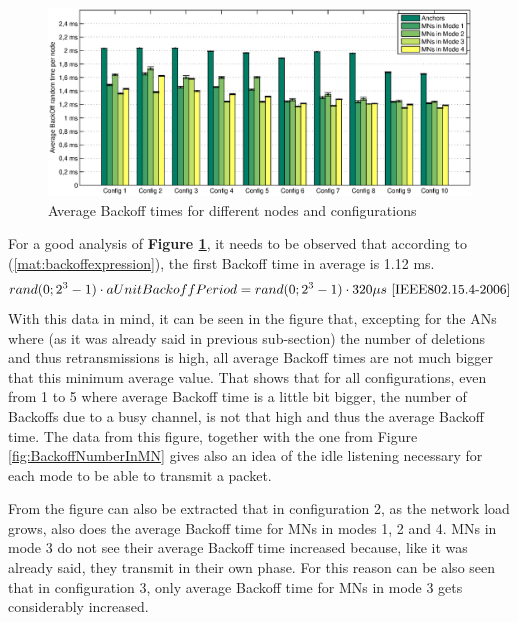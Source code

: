 \begin{figure}[ht]
 \begin{center}
  \includegraphics[width=1\textwidth]{averageBackoffTimeANandMN.eps}
 \end{center}
 \caption{Average Backoff times for different nodes and configurations}
 \label{fig:averageBackoffTimeANandMN}
\end{figure}

For a good analysis of \textbf{Figure \ref{fig:averageBackoffTimeANandMN}}, it needs to be observed that according to (\ref{mat:backoffexpression}),
the first Backoff time in average is 1.12 ms.
\begin{equation}
  rand(0;  2^3-1)\cdot aUnitBackoffPeriod = rand(0; 2^3-1)\cdot 320\mu s\ \cite{IEEE802.15.4-2006}
  \label{mat:backoffexpression}
\end{equation}
With this data in mind, it can be seen in the figure that, excepting for the \acp{AN} where (as it was already said in previous sub-section) the 
number of deletions and thus retransmissions is high, all average Backoff times are not much bigger that this minimum average value. That shows that for
all configurations, even from 1 to 5 where average Backoff time is a little bit bigger, the number of Backoffs due to a busy channel,
is not that high and thus the average Backoff time. The data from this figure, together with the one from Figure \ref{fig:BackoffNumberInMN} gives
also an idea of the idle listening necessary for each mode to be able to transmit a packet.

From the figure can also be extracted that in configuration 2, as the network load grows, also does the average Backoff time for \acp{MN} in modes 1, 2 
and 4. \acp{MN} in mode 3 do not see their average Backoff time increased because, like it was already said, they transmit in their own phase. For this
reason can be also seen that in configuration 3, only average Backoff time for \acp{MN} in mode 3 gets considerably increased.

